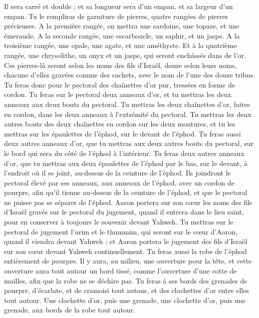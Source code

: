 \begin{multicols}{2}
Il sera carré et double ; et sa longueur sera d’un empan, et sa largeur d'un empan.
Tu le rempliras de garniture de pierres, quatre rangées de pierres précieuses. A la première rangée, on mettra une sardoine, une topaze, et une émeraude.
A la seconde rangée, une escarboucle, un saphir, et un jaspe.
A la troisième rangée, une opale, une agate, et une améthyste.
Et à la quatrième rangée, une chrysolithe, un onyx et un jaspe, qui seront enchâssés dans de l'or.
Ces pierres-là seront selon les noms des fils d'Israël, douze selon leurs noms, chacune d'elles gravées comme des cachets, avec le nom de l’une des douze tribus.
Tu feras donc pour le pectoral des chaînettes d’or pur, tressées en forme de cordon.
Tu feras sur le pectoral deux anneaux d'or, et tu mettras les deux anneaux aux deux bouts du pectoral.
Tu mettras les deux chaînettes d'or, faites en cordon, dans les deux anneaux à l'extrémité du pectoral.
Tu mettras les deux autres bouts des deux chaînettes en cordon sur les deux montures, et tu les mettras sur les épaulettes de l'éphod, sur le devant de l'éphod.
Tu feras aussi deux autres anneaux d'or, que tu mettras aux deux autres bouts du pectoral, sur le bord qui sera du côté de l'éphod à l’intérieur.
Tu feras deux autres anneaux d'or, que tu mettras aux deux épaulettes de l'éphod par le bas, sur le devant, à l'endroit où il se joint, au-dessus de la ceinture de l'éphod.
Ils joindront le pectoral élevé par ses anneaux, aux anneaux de l'éphod, avec un cordon de pourpre, afin qu'il tienne au-dessus de la ceinture de l'éphod, et que le pectoral ne puisse pas se séparer de l'éphod.
Aaron portera sur son cœur les noms des fils d'Israël gravés sur le pectoral du jugement, quand il entrera dans le lieu saint, pour en conserver à toujours le souvenir devant Yahweh.
Tu mettras sur le pectoral de jugement l'urim et le thummim\FTNT{}, qui seront sur le cœur d'Aaron, quand il viendra devant Yahweh ; et Aaron portera le jugement des fils d'Israël sur son cœur devant Yahweh continuellement.
Tu feras aussi la robe de l'éphod entièrement de pourpre.
Il y aura, au milieu, une ouverture pour la tête, et cette ouverture aura tout autour un bord tissé, comme l’ouverture d’une cotte de mailles, afin que la robe ne se déchire pas.
Tu feras à ses bords des grenades de pourpre, d'écarlate, et de cramoisi tout autour, et des clochettes d'or entre elles tout autour.
Une clochette d'or, puis une grenade, une clochette d'or, puis une grenade, aux bords de la robe tout autour.

\end{multicols}
